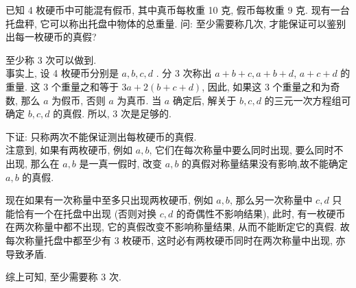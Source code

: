 \begin{example}
	已知 4 枚硬币中可能混有假币, 其中真币每枚重 10 克, 假币每枚重 9 克. 现有一台托盘秤, 它可以称出托盘中物体的总重量. 问: 至少需要称几次, 才能保证可以鉴别出每一枚硬币的真假?
\end{example}
\begin{solution}
	至少称 3 次可以做到.\\
	事实上, 设 4 枚硬币分别是 $a ,  b ,  c ,  d$ .  分 3 次称出 $a+b+c, a+b+d$, $a+c+d$ 的重量. 这 3 个重量之和等于 $3 a+2(b+c+d)$, 因此, 如果这 3 个重量之和为奇数, 那么 $a$ 为假币, 否则 $a$ 为真币. 当 $a$ 确定后, 解关于 $b ,  c ,  d$ 的三元一次方程组可确定 $b ,  c, d$ 的真假. 所以, 3 次是足够的.

	下证: 只称两次不能保证测出每枚硬币的真假. \\
	注意到, 如果有两枚硬币, 例如 $a, b$, 它们在每次称量中要么同时出现, 要么同时不出现, 那么在 $a ,  b$ 是一真一假时, 改变 $a ,  b$ 的真假对称量结果没有影响,故不能确定 $a, b$ 的真假.

	现在如果有一次称量中至多只出现两枚硬币, 例如 $a ,  b$, 那么另一次称量中 $c ,  d$ 只能恰有一个在托盘中出现 (否则对换 $c, d$ 的奇偶性不影响结果), 此时, 有一枚硬币在两次称量中都不出现, 它的真假改变不影响称量结果, 从而不能断定它的真假. 故每次称量托盘中都至少有 3 枚硬币, 这时必有两枚硬币同时在两次称量中出现, 亦导致矛盾.

	综上可知, 至少需要称 3 次.
\end{solution}



